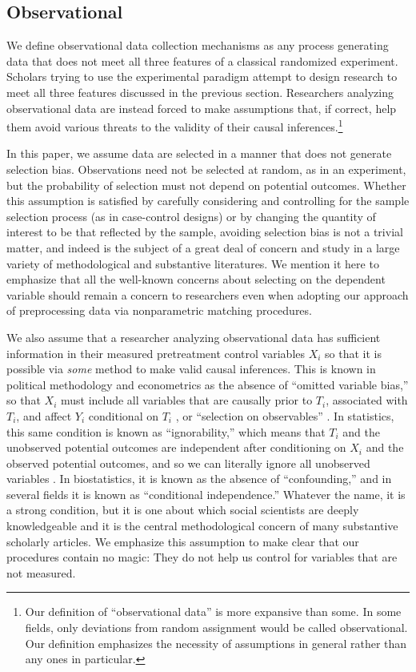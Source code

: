 \documentclass[11pt,titlepage]{article}
\begin{document}
\subsection{Observational}

We define observational data collection mechanisms as any process
generating data that does not meet all three features of a classical
randomized experiment.  Scholars trying to use the experimental
paradigm attempt to design research to meet all three features
discussed in the previous section.  Researchers analyzing
observational data are instead forced to make assumptions that, if
correct, help them avoid various threats to the validity of their
causal inferences.\footnote{Our definition of ``observational data''
  is more expansive than some.  In some fields, only deviations from
  random assignment would be called observational.  Our definition
  emphasizes the necessity of assumptions in general rather than any
  ones in particular.}

In this paper, we assume data are selected in a manner that does not
generate selection bias.  Observations need not be selected at random,
as in an experiment, but the probability of selection must not depend
on potential outcomes.  Whether this assumption is satisfied by
carefully considering and controlling for the sample selection process
(as in case-control designs) or by changing the quantity of interest
to be that reflected by the sample, avoiding selection bias is not a
trivial matter, and indeed is the subject of a great deal of concern
and study in a large variety of methodological and substantive
literatures.  We mention it here to emphasize that all the well-known
concerns about selecting on the dependent variable should remain a
concern to researchers even when adopting our approach of
preprocessing data via nonparametric matching procedures.

We also assume that a researcher analyzing observational data has
sufficient information in their measured pretreatment control
variables $X_i$ so that it is possible via \emph{some} method to make
valid causal inferences.  This is known in political methodology and
econometrics as the absence of ``omitted variable bias,'' so that
$X_i$ must include all variables that are causally prior to $T_i$,
associated with $T_i$, and affect $Y_i$ conditional on $T_i$
\citep{Goldberger91,KinKeoVer94}, or ``selection on observables''
\citep{HecRob85}.  In statistics, this same condition is known as
``ignorability,'' which means that $T_i$ and the unobserved potential
outcomes are independent after conditioning on $X_i$ and the observed
potential outcomes, and so we can literally ignore all unobserved
variables \citep{Rubin78}.  In biostatistics, it is known as the
absence of ``confounding,'' and in several fields it is known as
``conditional independence.''  Whatever the name, it is a strong
condition, but it is one about which social scientists are deeply
knowledgeable and it is the central methodological concern of many
substantive scholarly articles.  We emphasize this assumption to make
clear that our procedures contain no magic: They do not help us
control for variables that are not measured.
\end{document}
